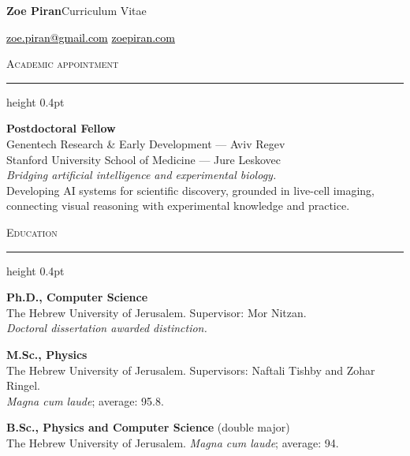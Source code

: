 \documentclass[11pt,letterpaper]{article}
\newcommand{\cvsection}[1]{%
  \par\addvspace{13pt}\Needspace{5\baselineskip}%
  {\large\scshape #1}\par\vspace{3pt}\hrule height 0.4pt\vspace{7pt}}
\newenvironment{dated}{\begin{description}[
  style=multiline,leftmargin=3.1cm,labelwidth=2.85cm,labelsep=.25cm,
  align=left,font=\normalfont\small,itemsep=5pt,parsep=0pt,topsep=0pt]}{\end{description}}
\newcommand{\entry}[2]{\Needspace{3\baselineskip}\item[{#1}]#2}
\begin{document}
{\LARGE\bfseries Zoe Piran}\hfill{Curriculum Vitae}\par
\vspace{5pt}
\href{mailto:zoe.piran@gmail.com}{\textcolor{black}{zoe.piran@gmail.com}}\quad
\href{https://zoepiran.com}{\textcolor{black}{zoepiran.com}}\par

\cvsection{Academic appointment}
\begin{dated}
\entry{Dec. 2024--present}{\textbf{Postdoctoral Fellow}\\
Genentech Research \& Early Development --- Aviv Regev\\
Stanford University School of Medicine --- Jure Leskovec\\[4pt]
\textit{Bridging artificial intelligence and experimental biology.}\\
Developing AI systems for scientific discovery, grounded in live-cell imaging, connecting visual reasoning with experimental knowledge and practice.}
\end{dated}

\cvsection{Education}
\begin{dated}
\entry{\smash{\parbox[t]{2.85cm}{Oct. 2020--\\Dec. 2024}}}{\textbf{Ph.D., Computer Science}\\
The Hebrew University of Jerusalem. Supervisor: Mor Nitzan.\\
\textit{Doctoral dissertation awarded distinction.}}
\entry{2018--2020}{\textbf{M.Sc., Physics}\\
The Hebrew University of Jerusalem. Supervisors: Naftali Tishby and Zohar Ringel.\\
\textit{Magna cum laude}; average: 95.8.}
\entry{2015--2018}{\textbf{B.Sc., Physics and Computer Science} (double major)\\
The Hebrew University of Jerusalem. \textit{Magna cum laude}; average: 94.}
\end{dated}
\end{document}
